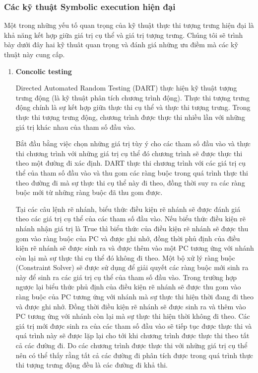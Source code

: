 \documentclass[12pt,a4paper]{article}
\begin{document}
\subsubsection{Các kỹ thuật Symbolic execution hiện đại}

Một trong những yếu tố quan trọng của kỹ thuật thực thi tượng trưng hiện đại là khả năng kết hợp giữa giá trị cụ thể và giá trị tượng trưng. Chúng tôi sẽ trình bày dưới đây hai kỹ thuât quan trọng và đánh giá những ưu điềm mà các kỹ thuật này cung cấp.

\begin{enumerate}
\item \textbf{Concolic testing}

Directed Automated Random Testing (DART) \cite{ganesh2007decision} thực hiện kỹ thuật tượng trưng động (là kỹ thuật phân tích chương trình động). Thực thi tượng trưng động chính là sự kết hợp giữa thực thi cụ thể và thực thi tượng trưng. Trong thực thi tượng trưng động, chương trình được thực thi nhiều lần với những giá trị khác nhau của tham số đầu vào.

Bắt đầu bằng việc chọn những giá trị tùy ý cho các tham số đầu vào và thực thi chương trình với những giá trị cụ thể đó chương trình sẽ được thực thi theo một đường đi xác định. DART thực thi chương trình với các giá trị cụ thể của tham số đầu vào và thu gom các ràng buộc trong quá trình thực thi theo đường đi mà sự thực thi cụ thể này đi theo, đồng thời suy ra các ràng buộc mới từ những ràng buộc đã thu gom được.

Tại các câu lệnh rẽ nhánh, biểu thức điều kiện rẽ nhánh sẽ được đánh giá theo các giá trị cụ thể của các tham số đầu vào. Nếu biểu thức điều kiện rẽ nhánh nhận giá trị là True thì biểu thức của điều kiện rẽ nhánh sẽ được thu gom vào ràng buộc của PC và được ghi nhớ, đồng thời phủ định của điều kiện rẽ nhánh sẽ được sinh ra và được thêm vào một PC tương ứng với nhánh còn lại mà sự thực thi cụ thể đó không đi theo. Một bộ xử lý ràng buộc (Constraint Solver) sẽ được sử dụng để giải quyết các ràng buộc mới sinh ra này để sinh ra các giá trị cụ thể của tham số đầu vào. Trong trường hợp ngược lại biểu thức phủ định của điều kiện rẽ nhánh sẽ được thu gom vào ràng buộc của PC tương ứng với nhánh mà sự thực thi hiện thời đang đi theo và được ghi nhớ. Đồng thời điều kiện rẽ nhánh sẽ được sinh ra và thêm vào PC tương ứng với nhánh còn lại mà sự thực thi hiện thời không đi theo. Các giá trị mới được sinh ra của các tham số đầu vào sẽ tiếp tục được thực thi và quá trình này sẽ được lặp lại cho tới khi chương trình được thực thi theo tất cả các đường đi. Do các chương trình được thực thi với những giá trị cụ thể nên có thể thấy rằng tất cả các đường đi phân tích được trong quá trình thực thi tượng trưng động đều là các đường đi khả thi.


\end{enumerate}
\end{document}
